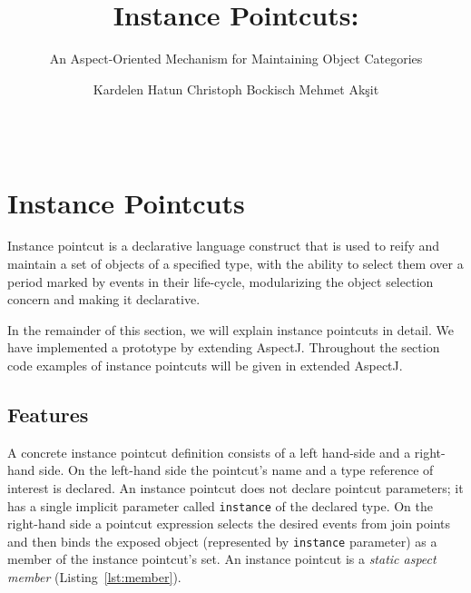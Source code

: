 \documentclass{acm_proc_article-sp}
\begin{document}
\title{Instance Pointcuts:}
\subtitle{An Aspect-Oriented Mechanism for Maintaining Object Categories}

\author{
\alignauthor
Kardelen Hatun \hspace{2cm} Christoph Bockisch \hspace{2cm} Mehmet Ak\c{s}it\\
\\
\\
}




\section{Instance Pointcuts}
Instance pointcut is a declarative language construct that is used to reify and maintain a set of objects of a specified type, with the ability to select them over a period marked by events in their life-cycle, modularizing the object selection concern and making it declarative. 
 
In the remainder of this section, we will explain instance pointcuts in detail. We have implemented a prototype by extending AspectJ. Throughout the section code examples of instance pointcuts will be given in extended AspectJ.


\subsection{Features}
\label{sec:features}

A concrete instance pointcut definition consists of a left hand-side and a right-hand side. 
On the left-hand side the pointcut's name and a type reference of interest is declared. 
An instance pointcut does not declare pointcut parameters; it has a single implicit parameter called \texttt{instance} of the declared type. 
On the right-hand side a pointcut expression selects the desired events from join points and then binds the exposed object (represented by \texttt{instance} parameter) as a member of the instance pointcut's set. 
An instance pointcut is a \emph{static aspect member} (Listing~\ref{lst:member}).%
\end{document}
